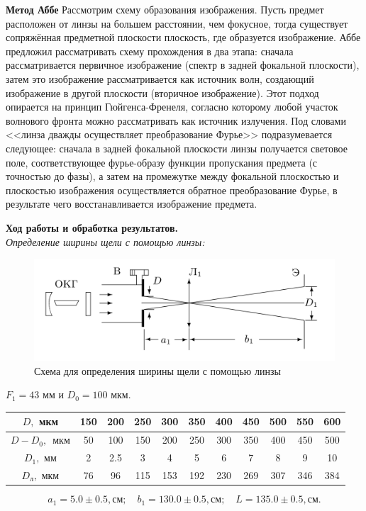 \documentclass[a4paper, 12pt]{article}%
\newcommand{\RomanNumeralCaps}[1]{\uppercase\expandafter{\romannumeral#1}}
\begin{document}
	\textbf{Метод Аббе}
	Рассмотрим схему образования изображения. Пусть предмет расположен от линзы на большем расстоянии, чем фокусное, тогда существует сопряжённая предметной плоскости плоскость, где образуется изображение. Аббе предложил рассматривать схему прохождения в два этапа: сначала рассматривается первичное изображение (спектр в задней фокальной плоскости), затем это изображение рассматривается как источник волн, создающий изображение в другой плоскости (вторичное изображение). Этот подход опирается на принцип Гюйгенса-Френеля, согласно которому любой участок волнового фронта можно рассматривать как источник излучения. Под словами <<линза дважды осуществляет преобразование Фурье>> подразумевается следующее: сначала в задней фокальной плоскости линзы получается световое поле, соответствующее фурье-образу функции пропускания предмета (с точностью до фазы), а затем на промежутке между фокальной плоскостью и плоскостью изображения осуществляется обратное преобразование Фурье, в результате чего восстанавливается изображение предмета.
	
	
\textbf{Ход работы и обработка результатов.}\\

\RomanNumeralCaps 1 \textit{Определение ширины щели с помощью линзы:}\\


	\begin{figure}[H]
		\begin{center}
		\includegraphics[width = 0.6\linewidth]{1.png}
		\caption{Схема для определения ширины щели с помощью линзы}
		\end{center}
	\end{figure}	
	
	$F_1 = 43$ мм и $D_0 = 100$ мкм.
	
	\begin{table}[H]
		\centering
		\begin{tabular}{|c|c|c|c|c|c|c|c|c|c|c|}  \hline
			$D,$ мкм & 150 & 200 & 250 & 300 & 350 & 400 & 450 & 500 & 550 & 600\\\hline
			$D - D_0, $\ мкм & 50 & 100 & 150 & 200 & 250 & 300 & 350 & 400 & 450 & 500 \\\hline
			$D_1,$ мм & 2 & 2.5 & 3 & 4 & 5 & 6 & 7 & 8 & 9 & 10 \\\hline
			$D_\text{л},$ мкм & 76 & 96 & 115 & 153 & 192 & 230 & 269 & 307 & 346 & 384
			\\\hline
		\end{tabular}
	\end{table}
	\[
	a_1 = 5.0 \pm 0.5, \text{см}; \quad b_1 = 130.0 \pm 0.5, \text{см}; \quad L = 135.0 \pm 0.5, \text{см}.
	\]
	
\end{document}
